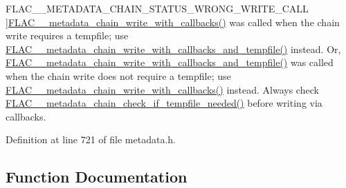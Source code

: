 \begin{Desc}
\begin{description}
{F\+L\+A\+C\+\_\+\+\_\+\+M\+E\+T\+A\+D\+A\+T\+A\+\_\+\+C\+H\+A\+I\+N\+\_\+\+S\+T\+A\+T\+U\+S\+\_\+\+W\+R\+O\+N\+G\+\_\+\+W\+R\+I\+T\+E\+\_\+\+C\+A\+LL\hypertarget{group__flac__metadata__level2_ggafe2a924893b0800b020bea8160fd4531af86670707345e2d02cc84aec059459d0}{}\label{group__flac__metadata__level2_ggafe2a924893b0800b020bea8160fd4531af86670707345e2d02cc84aec059459d0}
}]\hyperlink{group__flac__metadata__level2_ga6bf7552940ec2242718d1ab164b89e03}{F\+L\+A\+C\+\_\+\+\_\+metadata\+\_\+chain\+\_\+write\+\_\+with\+\_\+callbacks()} was called when the chain write requires a tempfile; use \hyperlink{group__flac__metadata__level2_ga371beab0d09d5248272bcb8d57de94f3}{F\+L\+A\+C\+\_\+\+\_\+metadata\+\_\+chain\+\_\+write\+\_\+with\+\_\+callbacks\+\_\+and\+\_\+tempfile()} instead. Or, \hyperlink{group__flac__metadata__level2_ga371beab0d09d5248272bcb8d57de94f3}{F\+L\+A\+C\+\_\+\+\_\+metadata\+\_\+chain\+\_\+write\+\_\+with\+\_\+callbacks\+\_\+and\+\_\+tempfile()} was called when the chain write does not require a tempfile; use \hyperlink{group__flac__metadata__level2_ga6bf7552940ec2242718d1ab164b89e03}{F\+L\+A\+C\+\_\+\+\_\+metadata\+\_\+chain\+\_\+write\+\_\+with\+\_\+callbacks()} instead. Always check \hyperlink{group__flac__metadata__level2_ga29a124cceaffce5376d073a032bd1c52}{F\+L\+A\+C\+\_\+\+\_\+metadata\+\_\+chain\+\_\+check\+\_\+if\+\_\+tempfile\+\_\+needed()} before writing via callbacks. \end{description}
\end{Desc}


Definition at line 721 of file metadata.\+h.



\subsection{Function Documentation}
